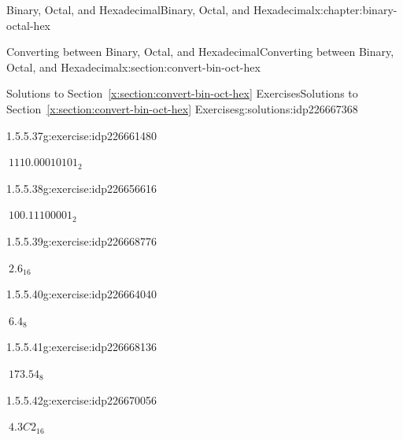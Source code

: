 \documentclass[twoside,10pt,]{book}
\newcommand{\xreffont}{\relax}
\numberwithin{equation}{section}
\begin{document}
\begin{chapterptx}{Binary, Octal, and Hexadecimal}{}{Binary, Octal, and Hexadecimal}{}{}{x:chapter:binary-octal-hex}
\begin{sectionptx}{Converting between Binary, Octal, and Hexadecimal}{}{Converting between Binary, Octal, and Hexadecimal}{}{}{x:section:convert-bin-oct-hex}
\begin{solutions-subsection}{Solutions to Section~{\xreffont\ref*{x:section:convert-bin-oct-hex}} Exercises}{}{Solutions to Section~{\xreffont\ref*{x:section:convert-bin-oct-hex}} Exercises}{}{}{g:solutions:idp226667368}
\par\medskip\noindent
\begin{exercisegroup}
\begin{divisionsolutioneg}{1.5.5.37}{}{g:exercise:idp226661480}%
\par\smallskip%
\noindent\hypertarget{g:solution:idp226655720-main}{}\(\ 1110.00010101_2\)\end{divisionsolutioneg}%
\begin{divisionsolutioneg}{1.5.5.38}{}{g:exercise:idp226656616}%
\par\smallskip%
\noindent\hypertarget{g:solution:idp226666216-main}{}\(\ 100.11100001_2\)\end{divisionsolutioneg}%
\begin{divisionsolutioneg}{1.5.5.39}{}{g:exercise:idp226668776}%
\par\smallskip%
\noindent\hypertarget{g:solution:idp226665704-main}{}\(\ 2.6_{16}\)\end{divisionsolutioneg}%
\begin{divisionsolutioneg}{1.5.5.40}{}{g:exercise:idp226664040}%
\par\smallskip%
\noindent\hypertarget{g:solution:idp226668520-main}{}\(\ 6.4_8\)\end{divisionsolutioneg}%
\begin{divisionsolutioneg}{1.5.5.41}{}{g:exercise:idp226668136}%
\par\smallskip%
\noindent\hypertarget{g:solution:idp226666728-main}{}\(\ 173.54_8\)\end{divisionsolutioneg}%
\begin{divisionsolutioneg}{1.5.5.42}{}{g:exercise:idp226670056}%
\par\smallskip%
\noindent\hypertarget{g:solution:idp226667240-main}{}\(\ 4.3C2_{16}\)\end{divisionsolutioneg}%
\end{exercisegroup}
\par\medskip\noindent
\end{solutions-subsection}
\end{sectionptx}
\end{chapterptx}
%
%
\typeout{************************************************}
\typeout{************************************************}
%
\end{document}
